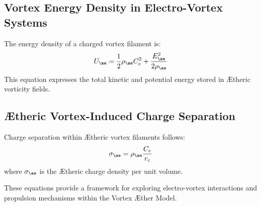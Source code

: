 \subsection{Vortex Energy Density in Electro-Vortex Systems}
The energy density of a charged vortex filament is:
\begin{equation}
    U_{\ae} = \frac{1}{2} \rho_\text{\ae} C_e^2 + \frac{E_{\ae}^2}{2 \rho_\text{\ae}}
\end{equation}
This equation expresses the total kinetic and potential energy stored in Ætheric vorticity fields.

\subsection{\AE theric Vortex-Induced Charge Separation}
Charge separation within Ætheric vortex filaments follows:
\begin{equation}
    \sigma_{\ae} = \rho_\text{\ae} \frac{C_e}{r_c}
\end{equation}
where $\sigma_{\ae}$ is the Ætheric charge density per unit volume.

These equations provide a framework for exploring electro-vortex interactions and propulsion mechanisms within the Vortex Æther Model.